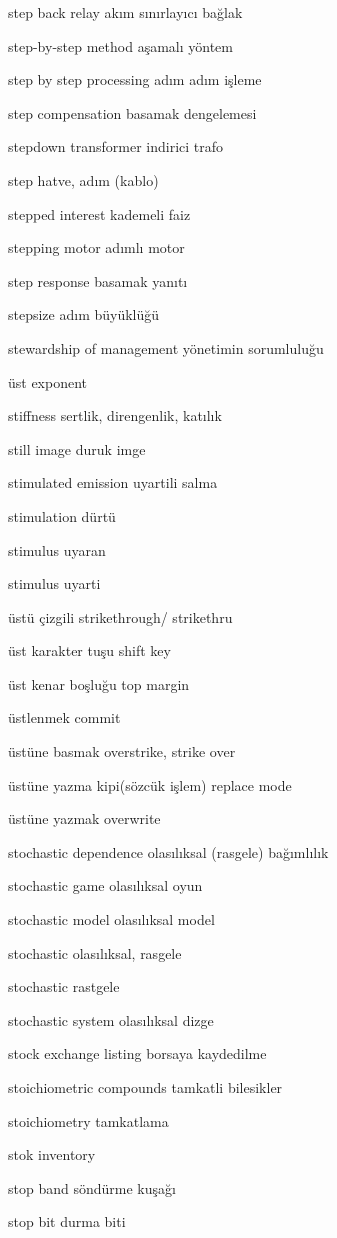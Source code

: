 \documentclass[12pt,fleqn]{article}\usepackage{../../common}
\begin{document}
step back relay akım sınırlayıcı bağlak

step-by-step method aşamalı yöntem

step by step processing adım adım işleme

step compensation basamak dengelemesi

stepdown transformer indirici trafo

step hatve, adım (kablo)

stepped interest kademeli faiz

stepping motor adımlı motor

step response basamak yanıtı

stepsize adım büyüklüğü

stewardship of management yönetimin sorumluluğu

üst exponent

stiffness sertlik, direngenlik, katılık

still image duruk imge

stimulated emission uyartili salma

stimulation dürtü

stimulus uyaran

stimulus uyarti

üstü çizgili strikethrough/ strikethru

üst karakter tuşu shift key

üst kenar boşluğu top margin

üstlenmek commit

üstüne basmak overstrike, strike over

üstüne yazma kipi(sözcük işlem) replace mode

üstüne yazmak overwrite

stochastic dependence olasılıksal (rasgele) bağımlılık

stochastic game olasılıksal oyun

stochastic model olasılıksal model

stochastic olasılıksal, rasgele

stochastic rastgele

stochastic system olasılıksal dizge

stock exchange listing borsaya kaydedilme

stoichiometric compounds tamkatli bilesikler

stoichiometry tamkatlama

stok inventory

stop band söndürme kuşağı

stop bit durma biti
\end{document}
